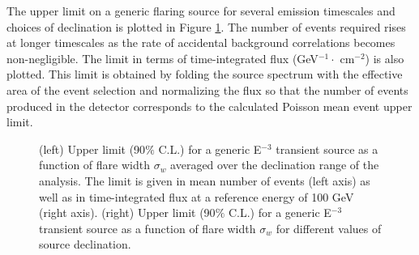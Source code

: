 \documentclass[manuscript]{aastex}
\begin{document}
The upper limit on a generic flaring source for several emission timescales and choices of declination is plotted in Figure \ref{fig:GenericE3Limit}. The number of events required rises at longer timescales as the rate of accidental background correlations becomes non-negligible. The limit in terms of time-integrated flux (GeV$^{-1} \cdot$ cm$^{-2}$) is also plotted. This limit is obtained by folding the source spectrum with the effective area of the event selection and normalizing the flux so that the number of events produced in the detector corresponds to the calculated Poisson mean event upper limit. 

\begin{figure}[ht]
\caption[Time-integrated Flux Limit for E$^{-3}$ Source]{(left) Upper limit (90$\%$ C.L.) for a generic E$^{-3}$ transient source as a function of flare width $\sigma_w$ averaged over the declination range of the analysis. The limit is given in mean number of events (left axis) as well as in time-integrated flux at a reference energy of 100 GeV (right axis). (right) Upper limit (90$\%$ C.L.) for a generic E$^{-3}$ transient source as a function of flare width $\sigma_w$ for different values of source declination.}
\label{fig:GenericE3Limit}
\end{figure}
\end{document}
